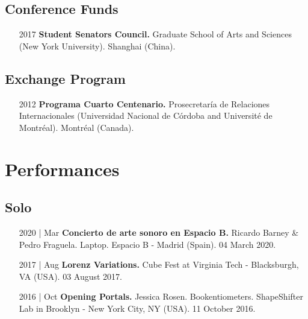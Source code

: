\documentclass[12pt,overlapped]{res}%
\begin{document}
\begin{resume}
\subsection{Conference Funds}%
\fullline%
\begin{itemize}[align=parleft,leftmargin=2.25cm,labelwidth=2cm]
\item[2017]
\textbf{Student Senators Council.}
Graduate School of Arts and Sciences (New York University). 
Shanghai (China). 
\end{itemize}%
\subsection{Exchange Program}%
\fullline%
\begin{itemize}[align=parleft,leftmargin=2.25cm,labelwidth=2cm]
\item[2012]
\textbf{Programa Cuarto Centenario.}
Prosecretaría de Relaciones Internacionales (Universidad Nacional de Córdoba and Université de Montréal). 
Montréal (Canada). 
\end{itemize}


\section{Performances}%
\label{sec:Performances}%
\subsection{Solo}%
\fullline%
\begin{itemize}[align=parleft,leftmargin=2.25cm,labelwidth=2cm]
\item[2020 | Mar]
\textbf{Concierto de arte sonoro en Espacio B.}
Ricardo Barney \& Pedro Fraguela. 
Laptop. 
Espacio B {-} Madrid (Spain). 
04 March 2020.
\end{itemize}%
\begin{itemize}[align=parleft,leftmargin=2.25cm,labelwidth=2cm]
\item[2017 | Aug]
\textbf{Lorenz Variations.}
Cube Fest at Virginia Tech {-} Blacksburgh, VA (USA). 
03 August 2017.
\end{itemize}%
\begin{itemize}[align=parleft,leftmargin=2.25cm,labelwidth=2cm]
\item[2016 | Oct]
\textbf{Opening Portals.}
Jessica Rosen. 
Bookentiometers. 
ShapeShifter Lab in Brooklyn {-} New York City, NY (USA). 
11 October 2016.
\end{itemize}%

\end{resume}
\end{document}
